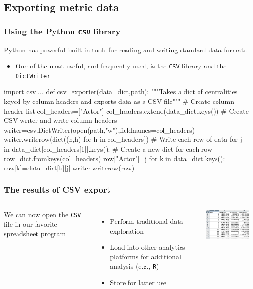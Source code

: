 \documentclass[xcolor=dvipsnames, 9pt]{beamer}
\begin{document}

\subsection{Exporting metric data} %
\label{sub:exporting_metric_data}

\begin{frame}[fragile]
    \frametitle{Using the Python \texttt{CSV} library}
    Python has powerful built-in tools for reading and writing standard data formats
    \begin{itemize}
        \item One of the most useful, and frequently used, is the \texttt{CSV} library and the \texttt{DictWriter}
    \end{itemize}
    \begin{block}{}
        \begin{code}
\scriptsize{\alert<2>{import csv}
...
def csv_exporter(\alert<3>{data_dict,path}):
    """Takes a dict of centralities keyed by column headers and exports 
    data as a CSV file"""
    \alert<4>{# Create column header list
    col_headers=["Actor"]
    col_headers.extend(data_dict.keys())}
    \alert<5>{# Create CSV writer and write column headers
    writer=csv.DictWriter(open(path,"w"),fieldnames=col_headers)
    writer.writerow(dict((h,h) for h in col_headers))}
    \alert<6>{# Write each row of data
    for j in data_dict[col_headers[1]].keys():}
        \alert<7>{# Create a new dict for each row
        row=dict.fromkeys(col_headers)
        row["Actor"]=j
        for k in data_dict.keys():
            row[k]=data_dict[k][j]
        writer.writerow(row)}}
        \end{code}
    \end{block}
\end{frame}

\begin{frame}[fragile]
    \frametitle{The results of CSV export}
    \begin{columns}
        We can now open the \texttt{CSV} file in our favorite spreadsheet program
        \begin{itemize}
            \item Perform traditional data exploration
            \item Load into other analytics platforms for additional analysis (e.g., \texttt{R})
            \item Store for latter use
        \end{itemize}
        \includegraphics[width=5.5cm]{../images/figures/metrics_screen_shot.png}
    \end{columns}
\end{frame}
\end{document}
